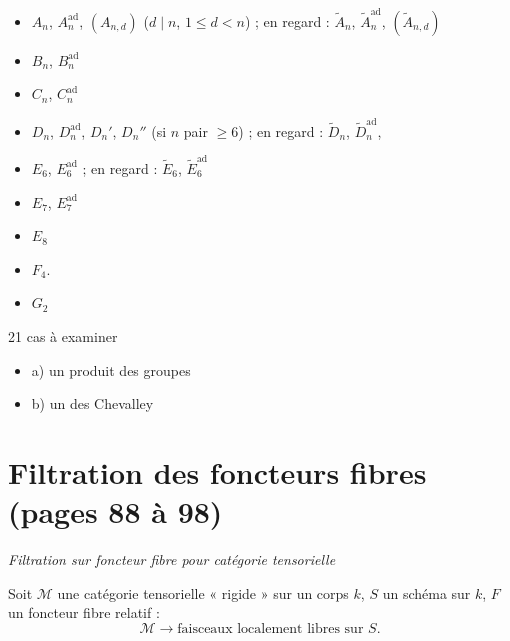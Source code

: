 \documentclass[11pt,a4paper]{article}
\begin{document}

\begin{itemize}
  \item $A_{n}$, $A_{n}^{\mathrm{ad}}$, $(A_{n,d})$ ($d \mid n$,
        $1 \leq d < n$) ; en regard : $\tilde{A}_{n}$,
        $\tilde{A}_{n}^{\mathrm{ad}}$, $(\tilde{A}_{n,d})$
  \item $B_{n}$, $B_{n}^{\mathrm{ad}}$
  \item $C_{n}$, $C_{n}^{\mathrm{ad}}$
  \item $D_{n}$, $D_{n}^{\mathrm{ad}}$, $D_{n}'$, $D_{n}''$ (si $n$ pair
        $\geq 6$) ; en regard : $\tilde{D}_{n}$,
        $\tilde{D}_{n}^{\mathrm{ad}}$, 
  \item $E_{6}$, $E_{6}^{\mathrm{ad}}$ ; en regard : $\tilde{E}_{6}$,
        $\tilde{E}_{6}^{\mathrm{ad}}$
  \item $E_{7}$, $E_{7}^{\mathrm{ad}}$
  \item $E_{8}$
  \item $F_{4}$.
  \item $G_{2}$
\end{itemize}

21 cas à examiner
\begin{itemize}
  \item a) un produit \ill{} des groupes \ill{}
  \item b) un \ill{} des Chevalley
\end{itemize}

\section*{Filtration des foncteurs fibres (pages 88 à 98)}


\emph{Filtration sur foncteur fibre pour catégorie tensorielle}

Soit  $\mathcal{M}$ une catégorie tensorielle 
« rigide \ill{} » sur un corps $k$, $S$ un schéma sur $k$, $F$ un foncteur
fibre relatif :
\[
\mathcal{M} \longrightarrow
\text{faisceaux localement libres sur } S .
\]
\end{document}
